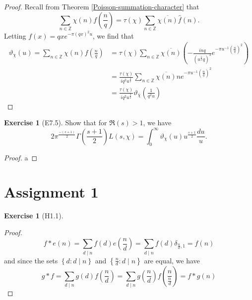 \documentclass[reqno]{amsart}
\theoremstyle{definition}
\newtheorem{exercise}[theorem]{Exercise}
\theoremstyle{remark}
\begin{document}
\begin{proof}
    Recall from Theorem \ref{Poisson-summation-character} that
    \[
    \sum_{n \in \mathbb{Z}}\chi(n) f\left( \frac{n}{q} \right) 
    = \tau(\chi) \sum_{n \in \mathbb{Z}}
    \overline{\chi(n)} \hat{f}(n).
    \] 
    Letting $f(x) = 
    qx e^{- \pi (qx)^2 u}$, we find that
    \begin{align*}
    \vartheta_{\chi}(u)
    = \sum_{n \in \mathbb{Z}} \chi(n)
    f \left( \frac{n}{q} \right) 
    &= \tau(\chi) \sum_{n \in \mathbb{Z}}
    \overline{\chi(n)}
    \left( - \frac{in q}{\left( u^{\frac{1}{2}}q \right)^3}
    e^{- \pi u^{-1} \left( \frac{n}{q} \right)^2 }\right) \\
    &= \frac{\tau(\chi)}{i q^2 u^{\frac{3}{2}}}
    \sum_{n \in \mathbb{Z}} \overline{\chi(n)}
    n e^{- \pi u^{-1} \left( \frac{n}{q} \right)^2}\\
    &=  \frac{\tau(\chi)}{i q^2 u^{\frac{3}{2}}}
    \vartheta_{\overline{\chi}}\left( \frac{1}{q^2 u} \right) 
    \end{align*}
\end{proof}

\begin{exercise}[E7.5]
    Show that for
    $\Re (s) > 1$, we have
    \[
    2 \pi^{\frac{-(s+1)}{2}} \Gamma\left( \frac{s+1}{2} \right) 
    L \left( s, \chi \right) 
    = \int_{0}^{\infty} 
    \vartheta_{\chi}(u) u^{\frac{s+1}{2}} \frac{du}{u}.
    \] 
\end{exercise}

\begin{proof}
    a
\end{proof}



\section{Assignment 1}


    \begin{exercise}[H1.1]
        \begin{proof}
            \[
            f * e (n) = \sum_{d  \mid n} f(d) e (\frac{n}{d})
            = \sum_{d  \mid n} f(d) \delta_{\frac{n}{d},1}
            = f(n)
            \] 
            and since the sets
            $\left\{ d \colon d \mid n \right\} $ and
            $\left\{ \frac{n}{d}  \colon
            d  \mid n\right\} $ are equal, we have
            \[
            g * f = 
            \sum_{d \mid n} g(d) f\left( \frac{n}{d} \right) 
            =
            \sum_{d  \mid n} g\left( \frac{n}{d} \right) 
            f \left( \frac{n}{\frac{n}{d}} \right) 
            = f * g (n)
            \] 
        \end{proof}
    \end{exercise}
\end{document}
